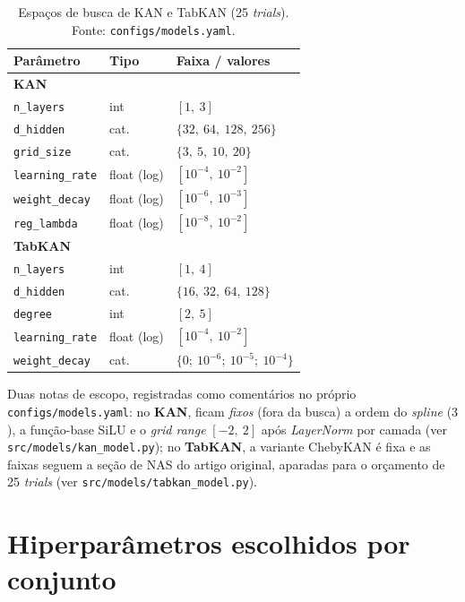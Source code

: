\begin{table}[htbp]
\centering\footnotesize
\caption[Espaços de busca --- redes KAN]{Espaços de busca de KAN e
TabKAN (25 \emph{trials}). Fonte: \texttt{configs/\allowbreak models.\allowbreak yaml}.}
\label{tab:app-busca-kan}
\begin{tabular}{lll}
\toprule
Parâmetro & Tipo & Faixa / valores \\
\midrule
\multicolumn{3}{l}{\textbf{KAN}} \\
\texttt{n\_layers}      & int   & $[1,\ 3]$ \\
\texttt{d\_hidden}      & cat.  & $\{32,\ 64,\ 128,\ 256\}$ \\
\texttt{grid\_size}     & cat.  & $\{3,\ 5,\ 10,\ 20\}$ \\
\texttt{learning\_rate} & float (log) & $[10^{-4},\ 10^{-2}]$ \\
\texttt{weight\_decay}  & float (log) & $[10^{-6},\ 10^{-3}]$ \\
\texttt{reg\_lambda}    & float (log) & $[10^{-8},\ 10^{-2}]$ \\
\midrule
\multicolumn{3}{l}{\textbf{TabKAN}} \\
\texttt{n\_layers}      & int   & $[1,\ 4]$ \\
\texttt{d\_hidden}      & cat.  & $\{16,\ 32,\ 64,\ 128\}$ \\
\texttt{degree}         & int   & $[2,\ 5]$ \\
\texttt{learning\_rate} & float (log) & $[10^{-4},\ 10^{-2}]$ \\
\texttt{weight\_decay}  & cat.  & $\{0;\ 10^{-6};\ 10^{-5};\ 10^{-4}\}$ \\
\bottomrule
\end{tabular}
\end{table}

Duas notas de escopo, registradas como comentários no próprio
\texttt{configs/\allowbreak models.\allowbreak yaml}: no \textbf{KAN}, ficam \emph{fixos}
(fora da busca) a ordem do \emph{spline} ($3$), a função-base SiLU e o
\emph{grid range} $[-2,\ 2]$ após \emph{LayerNorm} por camada (ver
\texttt{src/\allowbreak models/\allowbreak kan\_\allowbreak model.\allowbreak py}); no \textbf{TabKAN}, a variante
ChebyKAN é fixa e as faixas seguem a seção de NAS do artigo original,
aparadas para o orçamento de 25 \emph{trials} (ver
\texttt{src/\allowbreak models/\allowbreak tabkan\_\allowbreak model.\allowbreak py}).

\clearpage
\section{Hiperparâmetros escolhidos por conjunto}
\label{app:hp-escolhidos}

